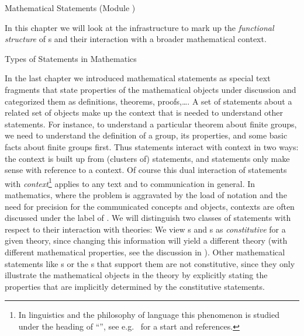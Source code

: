 
\begin{omgroup}[short=Mathematical Statements,id=statements]
{Mathematical Statements (Module {})}

  In this chapter we will look at the \omdoc infrastructure to mark up the
  {\emph{functional structure}} of {s} and their
  interaction with a broader mathematical context.
  
\begin{omgroup}[id=statements-constitutive]{Types of Statements in Mathematics}
\begin{module}[id=statementtypes]

  In the last chapter we introduced mathematical statements as special text fragments that
  state properties of the mathematical objects under discussion and categorized them as
  definitions, theorems, proofs,\ldots. A set of statements about a related set of objects
  make up the context that is needed to understand other statements.  For instance, to
  understand a particular theorem about finite groups, we need to understand the
  definition of a group, its properties, and some basic facts about finite groups
  first. Thus statements interact with context in two ways: the context is built up from
  (clusters of) statements, and statements only make sense with reference to a context. Of
  course this dual interaction of statements with {\emph{context}}\footnote{In linguistics
    and the philosophy of language this phenomenon is studied under the heading of
    ``{}'', see e.g.~\cite{KamRey:fdtl93}
    for a start and references.}  applies to any text and to communication in general. In
  mathematics, where the problem is aggravated by the load of notation and the need for
  precision for the communicated concepts and objects, contexts are often discussed under
  the label of . We will distinguish
  two classes of statements with respect to their interaction with theories: We view
  {s} and {s} as {\emph{constitutive}} for a given
  theory, since changing this information will yield a different theory (with different
  mathematical properties, see the discussion in {}).  Other
  mathematical statements like {s} or the {s} that
  support them are not constitutive, since they only illustrate the mathematical objects
  in the theory by explicitly stating the properties that are implicitly determined by the
  constitutive statements.
  

\end{module}
\end{omgroup}
\end{omgroup}
